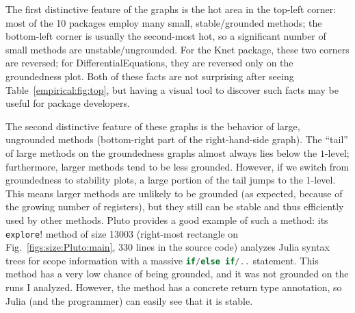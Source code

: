 \documentclass[oneside,openright,titlepage,numbers=noenddot,%
headinclude,footinclude,cleardoublepage=empty,abstract=on,
BCOR=5mm,paper=a4,fontsize=11pt,
dvipsnames
]{scrreprt}
\renewcommand{\c}[1]{\lstinline[language=Julia]!#1!\xspace}
\begin{document}
The first distinctive feature of the graphs is the hot area in the top-left
corner: most of the 10 packages employ many small, stable/grounded methods;
the bottom-left corner is usually the second-most hot, so a significant number
of small methods are unstable/ungrounded. For the Knet package,
these two corners are reversed; for DifferentialEquations, they are reversed
only on the groundedness plot. Both of these facts are not surprising after seeing
Table~\ref{empirical:fig:top}, but having a visual tool to discover such facts
may be useful for package developers.

The second distinctive feature of these graphs is the behavior of large,
ungrounded methods (bottom-right part of the right-hand-side graph). The
``tail'' of large methods on the groundedness graphs almost always lies below
the $1$-level; furthermore, larger methods tend to be less grounded.
However, if we switch from groundedness to stability plots, a large portion of
the tail jumps to the $1$-level. This means larger methods are unlikely to be
grounded (as expected, because of the growing number of registers), but they
still can be stable and thus efficiently used by other methods. Pluto provides a
good example of such a method: its \c{explore!} method of size 13003 (right-most
rectangle on Fig.~\ref{figs:size:Pluto:main}, 330 lines in the source code) analyzes
Julia syntax trees for scope information with a massive \c{if/else if/..} statement.
This method has a very low chance of being grounded, and it was not grounded on the
runs I analyzed. However, the method has a concrete return type annotation, so
Julia (and the programmer) can easily see that it is stable.


\end{document}
